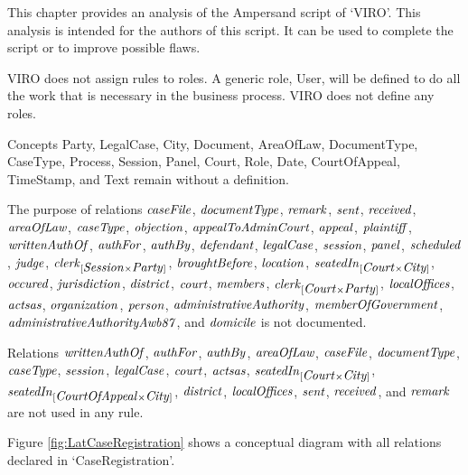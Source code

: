 \documentclass[10pt,a4paper]{report}              %
\theoremstyle{plain}\theorembodyfont{\rmfamily}\newtheorem{definition}{Definition}[section]
\theoremstyle{plain}\theorembodyfont{\rmfamily}\newtheorem{designrule}[definition]{Requirement}
\def\id#1{\mbox{\em #1\/}}
\begin{document}
This chapter provides an analysis of the Ampersand script of `VIRO'. This analysis is intended for the authors of this script. It can be used to complete the script or to improve possible flaws. 

VIRO does not assign rules to roles. A generic role, User, will be defined to do all the work that is necessary in the business process.
VIRO does not define any roles. 

Concepts Party, LegalCase, City, Document, AreaOfLaw, DocumentType, CaseType, Process, Session, Panel, Court, Role, Date, CourtOfAppeal, TimeStamp, and Text remain without a definition.

The purpose of relations ${\id{caseFile}}$, ${\id{documentType}}$, ${\id{remark}}$, ${\id{sent}}$, ${\id{received}}$, ${\id{areaOfLaw}}$, ${\id{caseType}}$, ${\id{objection}}$, ${\id{appealToAdminCourt}}$, ${\id{appeal}}$, ${\id{plaintiff}}$, ${\id{writtenAuthOf}}$, ${\id{authFor}}$, ${\id{authBy}}$, ${\id{defendant}}$, ${\id{legalCase}}$, ${\id{session}}$, ${\id{panel}}$, ${\id{scheduled}}$, ${\id{judge}}$, ${\id{clerk}}_{[{\id{Session}}{\times}{\id{Party}}]}$, ${\id{broughtBefore}}$, ${\id{location}}$, ${\id{seatedIn}}_{[{\id{Court}}{\times}{\id{City}}]}$, ${\id{occured}}$, ${\id{jurisdiction}}$, ${\id{district}}$, ${\id{court}}$, ${\id{members}}$, ${\id{clerk}}_{[{\id{Court}}{\times}{\id{Party}}]}$, ${\id{localOffices}}$, ${\id{actsas}}$, ${\id{organization}}$, ${\id{person}}$, ${\id{administrativeAuthority}}$, ${\id{memberOfGovernment}}$, ${\id{administrativeAuthorityAwb87}}$, and ${\id{domicile}}$ is not documented.

Relations ${\id{writtenAuthOf}}$, ${\id{authFor}}$, ${\id{authBy}}$, ${\id{areaOfLaw}}$, ${\id{caseFile}}$, ${\id{documentType}}$, ${\id{caseType}}$, ${\id{session}}$, ${\id{legalCase}}$, ${\id{court}}$, ${\id{actsas}}$, ${\id{seatedIn}}_{[{\id{Court}}{\times}{\id{City}}]}$, ${\id{seatedIn}}_{[{\id{CourtOfAppeal}}{\times}{\id{City}}]}$, ${\id{district}}$, ${\id{localOffices}}$, ${\id{sent}}$, ${\id{received}}$, and ${\id{remark}}$ are not used in any rule. 

Figure \ref{fig:LatCaseRegistration} shows a conceptual diagram with all relations declared in `CaseRegistration'.
\end{document}
